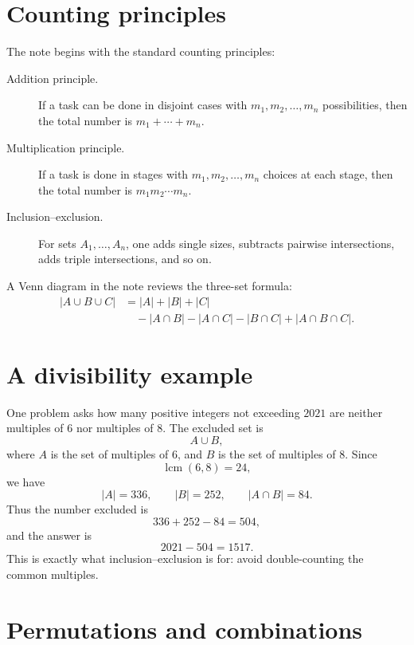 
\section{Counting principles}

The note begins with the standard counting principles:
\begin{description}
  \item[Addition principle.] If a task can be done in disjoint cases with \(m_1,m_2,\ldots,m_n\) possibilities, then the total number is \(m_1+\cdots+m_n\).
  \item[Multiplication principle.] If a task is done in stages with \(m_1,m_2,\ldots,m_n\) choices at each stage, then the total number is \(m_1m_2\cdots m_n\).
  \item[Inclusion--exclusion.] For sets \(A_1,\ldots,A_n\), one adds single sizes, subtracts pairwise intersections, adds triple intersections, and so on.

\end{description}

A Venn diagram in the note reviews the three-set formula:
\[
\begin{aligned}
|A\cup B\cup C|&=|A|+|B|+|C|\\
&\quad-|A\cap B|-|A\cap C|-|B\cap C|+|A\cap B\cap C|.
\end{aligned}
\]

\section{A divisibility example}

One problem asks how many positive integers not exceeding \(2021\) are neither multiples of \(6\) nor multiples of \(8\).  The excluded set is
\[
  A\cup B,
\]
where \(A\) is the set of multiples of \(6\), and \(B\) is the set of multiples of \(8\).  Since
\[
  \operatorname{lcm}(6,8)=24,
\]
we have
\[
  |A|=336,\qquad |B|=252,\qquad |A\cap B|=84.
\]
Thus the number excluded is
\[
  336+252-84=504,
\]
and the answer is
\[
  2021-504=1517.
\]
This is exactly what inclusion--exclusion is for: avoid double-counting the common multiples.

\section{Permutations and combinations}

